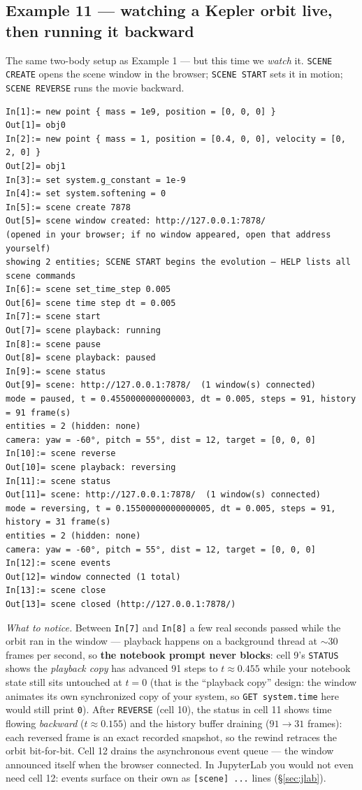 \documentclass[11pt]{article}
\newcommand{\kw}[1]{\texttt{\uppercase{#1}}}
\newcommand{\code}[1]{\texttt{#1}}
\begin{document}
\subsection{Example 11 --- watching a Kepler orbit live, then running it backward}

The same two-body setup as Example 1 --- but this time we \emph{watch}
it. \kw{scene create} opens the scene window in the browser;
\kw{scene start} sets it in motion; \kw{scene reverse} runs the movie
backward.

\begin{lstlisting}
In[1]:= new point { mass = 1e9, position = [0, 0, 0] }
Out[1]= obj0
In[2]:= new point { mass = 1, position = [0.4, 0, 0], velocity = [0, 2, 0] }
Out[2]= obj1
In[3]:= set system.g_constant = 1e-9
In[4]:= set system.softening = 0
In[5]:= scene create 7878
Out[5]= scene window created: http://127.0.0.1:7878/
(opened in your browser; if no window appeared, open that address yourself)
showing 2 entities; SCENE START begins the evolution — HELP lists all scene commands
In[6]:= scene set_time_step 0.005
Out[6]= scene time step dt = 0.005
In[7]:= scene start
Out[7]= scene playback: running
In[8]:= scene pause
Out[8]= scene playback: paused
In[9]:= scene status
Out[9]= scene: http://127.0.0.1:7878/  (1 window(s) connected)
mode = paused, t = 0.4550000000000003, dt = 0.005, steps = 91, history = 91 frame(s)
entities = 2 (hidden: none)
camera: yaw = -60°, pitch = 55°, dist = 12, target = [0, 0, 0]
In[10]:= scene reverse
Out[10]= scene playback: reversing
In[11]:= scene status
Out[11]= scene: http://127.0.0.1:7878/  (1 window(s) connected)
mode = reversing, t = 0.15500000000000005, dt = 0.005, steps = 91, history = 31 frame(s)
entities = 2 (hidden: none)
camera: yaw = -60°, pitch = 55°, dist = 12, target = [0, 0, 0]
In[12]:= scene events
Out[12]= window connected (1 total)
In[13]:= scene close
Out[13]= scene closed (http://127.0.0.1:7878/)
\end{lstlisting}

\emph{What to notice.} Between \code{In[7]} and \code{In[8]} a few
real seconds passed while the orbit ran in the window --- playback
happens on a background thread at $\sim$30 frames per second, so
\textbf{the notebook prompt never blocks}: cell 9's \kw{status} shows
the \emph{playback copy} has advanced 91 steps to $t \approx 0.455$
while your notebook state still sits untouched at $t = 0$ (that is the
``playback copy'' design: the window animates its own synchronized
copy of your system, so \code{GET system.time} here would still print
\code{0}). After \kw{reverse} (cell 10), the status in cell 11 shows
time flowing \emph{backward} ($t \approx 0.155$) and the history
buffer draining ($91 \to 31$ frames): each reversed frame is an exact
recorded snapshot, so the rewind retraces the orbit bit-for-bit. Cell
12 drains the asynchronous event queue --- the window announced itself
when the browser connected. In JupyterLab you would not even need cell
12: events surface on their own as \code{[scene] ...} lines
(\S\ref{sec:jlab}).
\end{document}
